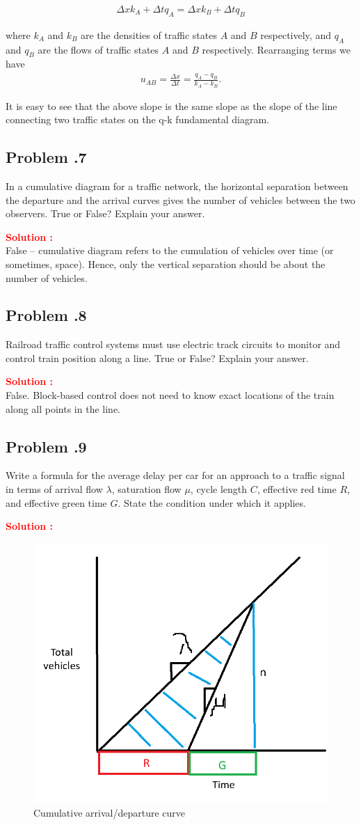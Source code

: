 \documentclass[12pt]{article}
\newcommand{\customsubsection}[1]{
  \subsection*{Problem \thesection.#1}
}
\begin{document}
\begin{align*}
    \Delta x k_A + \Delta t q_A = \Delta x k_B + \Delta t q_B
\end{align*}

where $k_A$ and $k_B$ are the densities of traffic states $A$ and $B$ respectively, and $q_A$ and $q_B$ are the flows of traffic states $A$ and $B$ respectively. Rearranging terms we have 
\begin{align*}
    u_{AB} = \frac{\Delta x}{\Delta t} = \frac{q_A - q_B}{k_A - k_B}.
\end{align*}

It is easy to see that the above slope is the same slope as the slope of the line connecting two traffic states on the q-k fundamental diagram.
\newpage



\customsubsection{7}
In a cumulative diagram for a traffic network, the horizontal separation between the departure and the arrival curves gives the number of vehicles between the two observers.  True or False? Explain your answer. 


\textbf{\textcolor{red}{Solution :}} \\
False -- cumulative diagram refers to the cumulation of vehicles over time (or sometimes, space). Hence, only the vertical separation should be about the number of vehicles.
\newpage


\customsubsection{8}
Railroad traffic control systems must use electric track circuits to monitor and control train position along a line. True or False? Explain your answer. 


\textbf{\textcolor{red}{Solution :}} \\
False. Block-based control does not need to know exact locations of the train along all points in the line.

\newpage



\customsubsection{9}
Write a formula for the average delay per car for an approach to a traffic signal in terms of arrival flow $\lambda$, saturation flow $\mu$, cycle length $C$, effective red time $R$, and effective green time $G$. State the condition under which it applies.


\textbf{\textcolor{red}{Solution :}} \\

 \begin{figure}[h!]
        \centering
        \includegraphics[width=0.5\linewidth]{img/P6_10.png}
        \caption{Cumulative arrival/departure curve}
        \label{fig:P6_10}
\end{figure}
\end{document}
